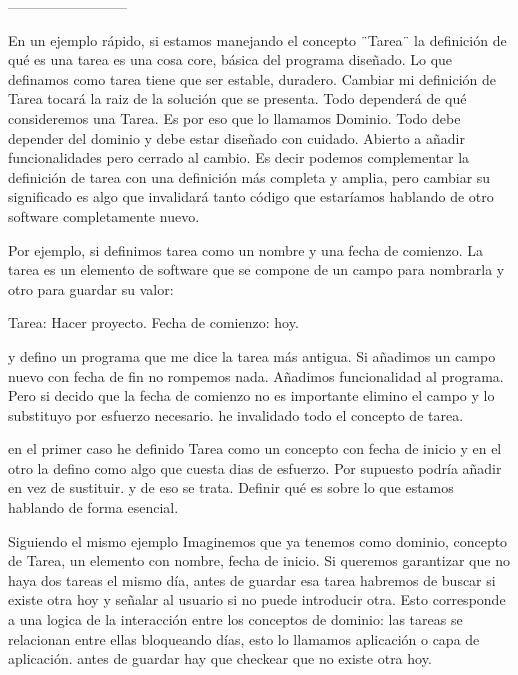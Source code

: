 \begin{figure}[H]
    
    \caption{}
    \label{fig:ProjectfolderStructurePortOut}
\end{figure}

--------------------------

En un ejemplo rápido, si estamos manejando el concepto ¨Tarea¨ la definición de qué es una tarea es una cosa core, básica del programa diseñado. Lo que definamos como tarea tiene que ser estable, duradero. Cambiar mi definición de Tarea tocará la raiz de la solución que se presenta. Todo dependerá de qué consideremos una Tarea. Es por eso que lo llamamos Dominio. Todo debe depender del dominio y debe estar diseñado con cuidado. Abierto a añadir funcionalidades pero cerrado al cambio. Es decir podemos complementar la definición de tarea con una definición más completa y amplia, pero cambiar su significado es algo que invalidará tanto código que estaríamos hablando de otro software completamente nuevo.

Por ejemplo, si definimos tarea como un nombre y una fecha de comienzo. La tarea es un elemento de software que se compone de un campo para nombrarla y otro para guardar su valor:

Tarea: Hacer proyecto.
Fecha de comienzo: hoy.

y defino un programa que me dice la tarea más antigua. Si añadimos un campo nuevo con fecha de fin no rompemos nada. Añadimos funcionalidad al programa. Pero si decido que la fecha de comienzo no es importante elimino el campo y lo substituyo por esfuerzo necesario. he invalidado todo el concepto de tarea.

en el primer caso he definido Tarea como un concepto con fecha de inicio y en el otro la defino como algo que cuesta dias de esfuerzo. Por supuesto podría añadir en vez de sustituir. y de eso se trata. Definir qué es sobre lo que estamos hablando de forma esencial.

Siguiendo el mismo ejemplo Imaginemos que ya tenemos como dominio, concepto de Tarea, un elemento con nombre, fecha de inicio. Si queremos garantizar que no haya dos tareas el mismo día, antes de guardar esa tarea habremos de buscar si existe otra hoy y señalar al usuario si no puede introducir otra. Esto corresponde a una logica de la interacción entre los conceptos de dominio: las tareas se relacionan entre ellas bloqueando días, esto lo llamamos aplicación o capa de aplicación. antes de guardar hay que checkear que no existe otra hoy.

